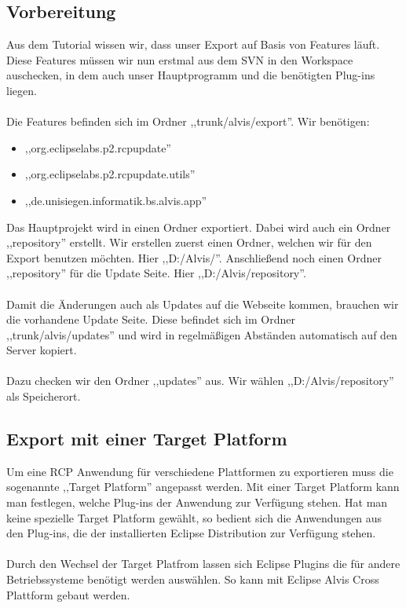 \documentclass[10pt,a4paper,oneside]{scrbook}
\begin{document}
\subsection{Vorbereitung}
Aus dem Tutorial wissen wir, dass unser Export auf Basis von Features läuft. Diese Features müssen wir nun erstmal aus dem SVN in den Workspace auschecken, in dem auch unser Hauptprogramm und die benötigten Plug-ins liegen.
\\ \\
Die Features befinden sich im Ordner ,,trunk/alvis/export''.
Wir benötigen:
\begin{itemize}
\item ,,org.eclipselabs.p2.rcpupdate''
\item ,,org.eclipselabs.p2.rcpupdate.utils''
\item ,,de.unisiegen.informatik.bs.alvis.app''
\end{itemize}

Das Hauptprojekt wird in einen Ordner exportiert. Dabei wird auch ein Ordner ,,repository'' erstellt. Wir erstellen zuerst einen Ordner, welchen wir für den Export benutzen möchten. Hier ,,D:/Alvis/''. Anschließend noch einen Ordner ,,repository'' für die Update Seite. Hier ,,D:/Alvis/repository''.
\\ \\
Damit die Änderungen auch als Updates auf die Webseite kommen, brauchen wir die vorhandene Update Seite. Diese befindet sich im Ordner ,,trunk/alvis/updates'' und wird in regelmäßigen Abständen automatisch auf den Server kopiert. 
\\ \\
Dazu checken wir den Ordner ,,updates'' aus. Wir wählen ,,D:/Alvis/repository'' als Speicherort.
\subsection{Export mit einer Target Platform}
Um eine RCP Anwendung für verschiedene Plattformen zu exportieren muss die sogenannte ,,Target Platform'' angepasst werden. Mit einer Target Platform kann man festlegen, welche Plug-ins der Anwendung zur Verfügung stehen. Hat man keine spezielle Target Platform gewählt, so bedient sich die Anwendungen aus den Plug-ins, die der installierten Eclipse Distribution zur Verfügung stehen.
\\
\\
Durch den Wechsel der Target Platfrom lassen sich Eclipse Plugins die für andere Betriebssysteme benötigt werden auswählen. So kann mit Eclipse Alvis Cross Plattform gebaut werden.
\end{document}
